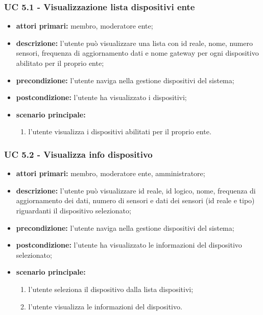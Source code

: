 			\subsubsection{UC 5.1 - Visualizzazione lista dispositivi ente}
			\begin{itemize}
				\item \textbf{attori primari:} membro, moderatore ente;
				\item \textbf{descrizione:} l'utente può visualizzare una lista con id reale, nome, numero sensori, frequenza di aggiornamento dati e nome gateway per ogni dispositivo abilitato per il proprio ente;
				\item \textbf{precondizione:} l'utente naviga nella gestione dispositivi del sistema;
				\item \textbf{postcondizione:} l'utente ha visualizzato i dispositivi;
				\item \textbf{scenario principale:}
				\begin{enumerate}
					\item{l'utente visualizza i dispositivi abilitati per il proprio ente.}
				\end{enumerate}
			\end{itemize}

			\subsubsection{UC 5.2 - Visualizza info dispositivo}
			\begin{itemize}
				\item \textbf{attori primari:} membro, moderatore ente, amministratore;
				\item \textbf{descrizione:} l'utente può visualizzare id reale, id logico, nome, frequenza di aggiornamento dei dati, numero di sensori e dati dei sensori (id reale e tipo) riguardanti il dispositivo selezionato;
				\item \textbf{precondizione:} l'utente naviga nella gestione dispositivi del sistema;
				\item \textbf{postcondizione:} l'utente ha visualizzato le informazioni del dispositivo selezionato;
				\item \textbf{scenario principale:}
				\begin{enumerate}
					\item{l'utente seleziona il dispositivo dalla lista dispositivi;}
					\item{l'utente visualizza le informazioni del dispositivo.}
				\end{enumerate}
			\end{itemize}

